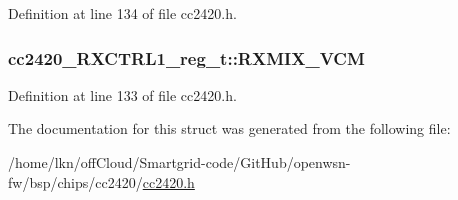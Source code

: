Definition at line 134 of file cc2420.\+h.

\subsubsection[{\texorpdfstring{R\+X\+M\+I\+X\+\_\+\+V\+CM}{RXMIX_VCM}}]{ cc2420\+\_\+\+R\+X\+C\+T\+R\+L1\+\_\+reg\+\_\+t\+::\+R\+X\+M\+I\+X\+\_\+\+V\+CM}\hypertarget{structcc2420___r_x_c_t_r_l1__reg__t_abd0b1d293bd289a680279ba4a4e59850}{}\label{structcc2420___r_x_c_t_r_l1__reg__t_abd0b1d293bd289a680279ba4a4e59850}


Definition at line 133 of file cc2420.\+h.



The documentation for this struct was generated from the following file\+:\begin{DoxyCompactItemize}
\item 
/home/lkn/off\+Cloud/\+Smartgrid-\/code/\+Git\+Hub/openwsn-\/fw/bsp/chips/cc2420/\hyperlink{cc2420_8h}{cc2420.\+h}\end{DoxyCompactItemize}
